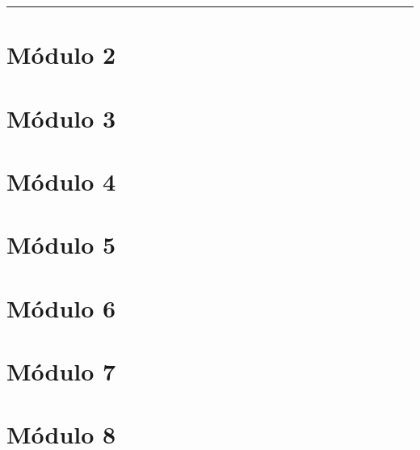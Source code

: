 \documentclass[
  letterpaper,
  DIV=11,
  numbers=noendperiod]{scrreprt}
\begin{document}
\begin{center}\rule{0.5\linewidth}{0.5pt}\end{center}

\hypertarget{muxf3dulo-2}{%
\chapter*{Módulo 2}\label{muxf3dulo-2}}


\hypertarget{muxf3dulo-3}{%
\chapter*{Módulo 3}\label{muxf3dulo-3}}


\hypertarget{muxf3dulo-4}{%
\chapter*{Módulo 4}\label{muxf3dulo-4}}


\hypertarget{muxf3dulo-5}{%
\chapter*{Módulo 5}\label{muxf3dulo-5}}


\hypertarget{muxf3dulo-6}{%
\chapter*{Módulo 6}\label{muxf3dulo-6}}


\hypertarget{muxf3dulo-7}{%
\chapter*{Módulo 7}\label{muxf3dulo-7}}


\hypertarget{muxf3dulo-8}{%
\chapter*{Módulo 8}\label{muxf3dulo-8}}
\end{document}
